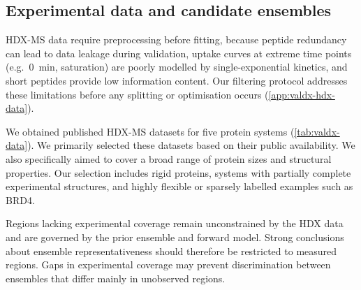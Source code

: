 \subsection{Experimental data and candidate ensembles}
\label{sec:valdx-inputs}

HDX-MS data require preprocessing before fitting, because peptide redundancy can lead to data leakage during validation, uptake curves at extreme time points (e.g.\ 0~min, saturation) are poorly modelled by single-exponential kinetics, and short peptides provide low information content. Our filtering protocol addresses these limitations before any splitting or optimisation occurs (\cref{app:valdx-hdx-data}).

We obtained published HDX-MS datasets for five protein systems (\cref{tab:valdx-data}). We primarily selected these datasets based on their public availability. We also specifically aimed to cover a broad range of protein sizes and structural properties. Our selection includes rigid proteins, systems with partially complete experimental structures, and highly flexible or sparsely labelled examples such as BRD4.

Regions lacking experimental coverage remain unconstrained by the HDX data and are governed by the prior ensemble and forward model. Strong conclusions about ensemble representativeness should therefore be restricted to measured regions. Gaps in experimental coverage may prevent discrimination between ensembles that differ mainly in unobserved regions.

